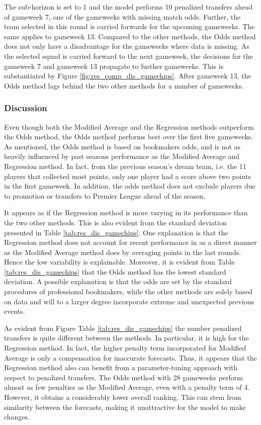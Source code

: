 \newpar

The sub-horizon is set to 1 and the model performs 10 penalized transfers ahead of gameweek 7, one of the gameweeks with missing match odds. Further, the team selected in this round is carried forwards for the upcoming gameweeks. The same applies to gameweek 13. Compared to the other methods, the Odds method does not only have a disadvantage for the gameweeks where data is missing. As the selected squad is carried forward to the next gameweek, the decisions for the gameweek 7 and gameweek 13 propagate to further gameweeks. This is substantiated by Figure \ref{fig:res_comp_dis_gamechips}. After gameweek 13, the Odds method lags behind the two other methods for a number of gameweeks.

\subsubsection{Discussion}

Even though both the Modified Average and the Regression methods outperform the Odds method, the Odds method performs best over the first five gameweeks. As mentioned, the Odds method is based on bookmakers odds, and is not as heavily influenced by past seasons performance as the Modified Average and Regression method. In fact, from the previous season’s dream team, i.e. the 11 players that collected most points, only one player had a score above two points in the first gameweek. In addition, the odds method does not exclude players due to promotion or transfers to Premier League ahead of the season.

\newpar

It appears as if the Regression method is more varying in its performance than the two other methods. This is also evident from the standard deviation presented in Table \ref{tab:res_dis_gamechips}. One explanation is that the Regression method does not account for recent performance in as a direct manner as the Modified Average method does by averaging points in the last rounds. Hence the low variability is explainable. Moreover, it is evident from Table \ref{tab:res_dis_gamechips} that the Odds method has the lowest standard deviation. A possible explanation is that the odds are set by the standard procedures of professional bookmakers, while the other methods are solely based on data and will to a larger degree incorporate extreme and unexpected previous events.

\newpar

As evident from Figure Table \ref{tab:res_dis_gamechips} the number penalized transfers is quite different between the methods. In particular, it is high for the Regression method. In fact, the higher penalty term incorporated for Modified Average is only a compensation for inaccurate forecasts. Thus, it appears that the Regression method also can benefit from a parameter-tuning approach with respect to penalized transfers. The Odds method with 28 gameweeks perform almost as few penalties as the Modified Average, even with a penalty term of 4. However, it obtains a considerably lower overall ranking. This can stem from similarity between the forecasts, making it unattractive for the model to make changes. 


